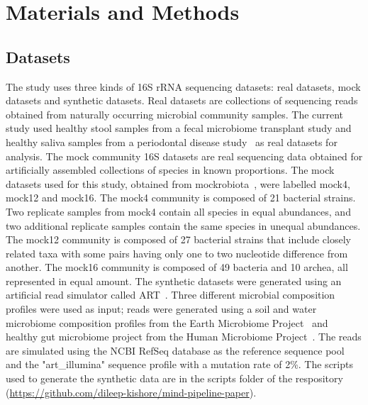 
\section*{Materials and Methods}

  \subsection*{Datasets}

  \vspace{-5mm}
  The study uses three kinds of 16S rRNA sequencing datasets: real datasets, mock datasets and synthetic datasets.
  Real datasets are collections of sequencing reads obtained from naturally occurring microbial community samples.
  The current study used healthy stool samples from a fecal microbiome transplant study \cite{Kang2017} and healthy saliva samples from a periodontal disease study~\cite{Chen2018} as real datasets for analysis.
  The mock community 16S datasets are real sequencing data obtained for artificially assembled collections of species in known proportions. The mock datasets used for this study, obtained from mockrobiota~\cite{Bokulich2016}, were labelled mock4, mock12 and mock16.
  The mock4 community is composed of 21 bacterial strains. Two replicate samples from mock4  contain all species in equal abundances, and two additional replicate samples contain the same species in unequal abundances.
  The mock12 community is composed of 27 bacterial strains that include closely related taxa with some pairs having only one to two nucleotide difference from another.
  The mock16 community is composed of 49 bacteria and 10 archea, all represented in equal amount.
  The synthetic datasets were generated using an artificial read simulator called ART~\cite{Huang2012}.
  Three different microbial composition profiles were used as input; reads were generated using a soil and water microbiome composition profiles from the Earth Microbiome Project~\cite{Thompson2017} and healthy gut microbiome project from the Human Microbiome Project~\cite{HumanMicrobiomeProjectConsortium2012}.
  The reads are simulated using the NCBI RefSeq database as the reference sequence pool and the "art\_illumina" sequence profile with a mutation rate of 2\%.
  The scripts used to generate the synthetic data are in the scripts folder of the respository (\href{https://github.com/dileep-kishore/mind-pipeline-paper}{https://github.com/dileep-kishore/mind-pipeline-paper}).

